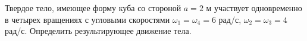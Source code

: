 Твердое тело, имеющее форму куба со стороной $a=2$ м 
участвует одновременно в четырех вращениях
с угловыми скоростями $\omega_{1}=\omega_{4}=6$ рад/с,
$\omega_{2}=\omega_{3}=4$ рад/с.
Определить результирующее движение тела.
